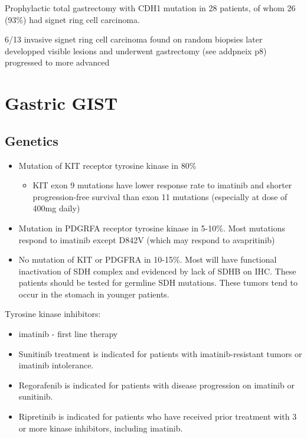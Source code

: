 \documentclass[
  letterpaper,
]{scrbook}
\providecommand{\tightlist}{%
  \setlength{\itemsep}{0pt}\setlength{\parskip}{0pt}}
\begin{document}
Prophylactic total gastrectomy with CDH1 mutation in 28 patients, of
whom 26 (93\%) had signet ring cell carcinoma.

6/13 invasive signet ring cell carcinoma found on random biopsies later
developped visible lesions and underwent gastrectomy (see addpneix p8)
progressed to more advanced

\chapter{Gastric GIST}\label{gastric-gist}

\section{Genetics}\label{genetics}

\begin{itemize}
\tightlist
\item
  Mutation of KIT receptor tyrosine kinase in 80\%

  \begin{itemize}
  \tightlist
  \item
    KIT exon 9 mutations have lower response rate to imatinib and
    shorter progression-free survival than exon 11 mutations (especially
    at dose of 400mg daily)
  \end{itemize}
\item
  Mutation in PDGRFA receptor tyrosine kinase in 5-10\%. Most mutations
  respond to imatinib except D842V (which may respond to avapritinib)
\item
  No mutation of KIT or PDGFRA in 10-15\%. Most will have functional
  inactivation of SDH complex and evidenced by lack of SDHB on IHC.
  These patients should be tested for germline SDH mutations. These
  tumors tend to occur in the stomach in younger patients.
\end{itemize}

Tyrosine kinase inhibitors:

\begin{itemize}
\tightlist
\item
  imatinib - first line therapy
\item
  Sunitinib treatment is indicated for patients with imatinib-resistant
  tumors or imatinib intolerance.
\item
  Regorafenib is indicated for patients with disease progression on
  imatinib or sunitinib.
\item
  Ripretinib is indicated for patients who have received prior treatment
  with 3 or more kinase inhibitors, including imatinib.
\end{itemize}
\end{document}
